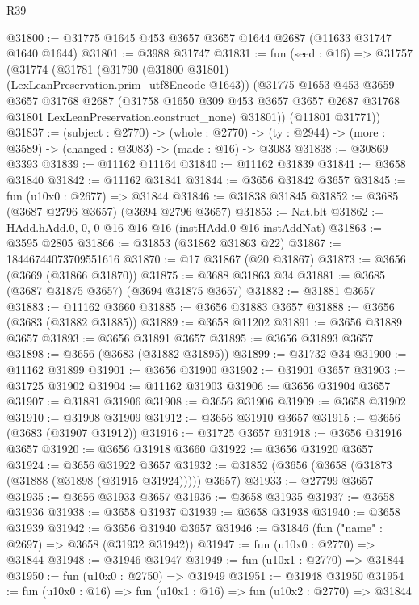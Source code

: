 \begin{lexlean}{R39}
\begin{coremodule}
@31800 := @31775 @1645 @453 @3657 @3657 @1644 @2687 (@11633 @31747 @1640 @1644)
@31801 := @3988 @31747
@31831 := fun (seed : @16) =>
  @31757
    (@31774
      (@31781
        (@31790 (@31800 @31801) (LexLeanPreservation.prim_utf8Encode @1643))
        (@31775
          @1653
          @453
          @3659
          @3657
          @31768
          @2687
          (@31758
            @1650
            @309
            @453
            @3657
            @3657
            @2687
            @31768
            @31801
            LexLeanPreservation.construct_none)
          @31801))
      (@11801 @31771))
@31837 := (subject : @2770) ->
  (whole : @2770) -> (ty : @2944) -> (more : @3589) -> (changed : @3083) -> (made : @16) -> @3083
@31838 := @30869 @3393
@31839 := @11162 @11164
@31840 := @11162 @31839
@31841 := @3658 @31840
@31842 := @11162 @31841
@31844 := @3656 @31842 @3657
@31845 := fun (u10x0 : @2677) => @31844
@31846 := @31838 @31845
@31852 := @3685 (@3687 @2796 @3657) (@3694 @2796 @3657)
@31853 := Nat.blt
@31862 := HAdd.hAdd.{0, 0, 0} @16 @16 @16 (instHAdd.{0} @16 instAddNat)
@31863 := @3595 @2805
@31866 := @31853 (@31862 @31863 @22)
@31867 := 18446744073709551616
@31870 := @17 @31867 (@20 @31867)
@31873 := @3656 (@3669 (@31866 @31870))
@31875 := @3688 @31863 @34
@31881 := @3685 (@3687 @31875 @3657) (@3694 @31875 @3657)
@31882 := @31881 @3657
@31883 := @11162 @3660
@31885 := @3656 @31883 @3657
@31888 := @3656 (@3683 (@31882 @31885))
@31889 := @3658 @11202
@31891 := @3656 @31889 @3657
@31893 := @3656 @31891 @3657
@31895 := @3656 @31893 @3657
@31898 := @3656 (@3683 (@31882 @31895))
@31899 := @31732 @34
@31900 := @11162 @31899
@31901 := @3656 @31900
@31902 := @31901 @3657
@31903 := @31725 @31902
@31904 := @11162 @31903
@31906 := @3656 @31904 @3657
@31907 := @31881 @31906
@31908 := @3656 @31906
@31909 := @3658 @31902
@31910 := @31908 @31909
@31912 := @3656 @31910 @3657
@31915 := @3656 (@3683 (@31907 @31912))
@31916 := @31725 @3657
@31918 := @3656 @31916 @3657
@31920 := @3656 @31918 @3660
@31922 := @3656 @31920 @3657
@31924 := @3656 @31922 @3657
@31932 := @31852 (@3656 (@3658 (@31873 (@31888 (@31898 (@31915 @31924))))) @3657)
@31933 := @27799 @3657
@31935 := @3656 @31933 @3657
@31936 := @3658 @31935
@31937 := @3658 @31936
@31938 := @3658 @31937
@31939 := @3658 @31938
@31940 := @3658 @31939
@31942 := @3656 @31940 @3657
@31946 := @31846 (fun ("name" : @2697) => @3658 (@31932 @31942))
@31947 := fun (u10x0 : @2770) => @31844
@31948 := @31946 @31947
@31949 := fun (u10x1 : @2770) => @31844
@31950 := fun (u10x0 : @2750) => @31949
@31951 := @31948 @31950
@31954 := fun (u10x0 : @16) => fun (u10x1 : @16) => fun (u10x2 : @2770) => @31844

\end{coremodule}
\end{lexlean}
